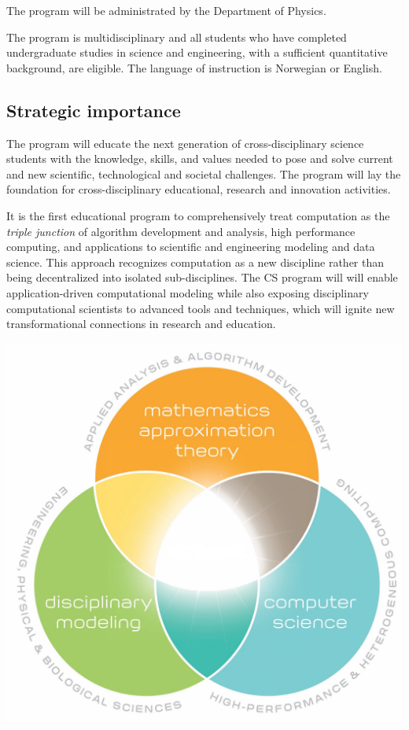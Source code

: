 \documentclass[%
oneside,                 %
final,                   %
10pt]{article}
\begin{document}
\noindent
The program will be administrated by the Department of Physics.

The program is multidisciplinary and all students who have completed
undergraduate studies in science and engineering, with a sufficient
quantitative background, are eligible.  The language of instruction is
Norwegian or English.



\subsection{Strategic importance}

The program will educate the next generation of cross-disciplinary
science students with the knowledge, skills, and values needed to pose
and solve current and new scientific, technological and societal
challenges. The program will lay the foundation for cross-disciplinary
educational, research and innovation activities.

It is the first educational program to
comprehensively treat computation as the \emph{triple junction} of
algorithm development and analysis, high performance computing, and
applications to scientific and engineering modeling and data
science. This approach recognizes computation as a new discipline
rather than being decentralized into isolated sub-disciplines. The CS program
will  will enable application-driven computational modeling
while also exposing disciplinary computational scientists to
advanced tools and techniques, which will ignite new
transformational connections in research and education.

\vspace{6mm}

\centerline{\includegraphics[width=0.6\linewidth]{figslides/cs.jpg}}
\end{document}
